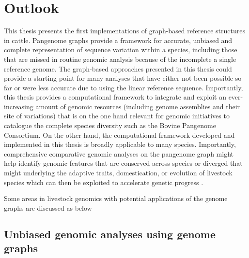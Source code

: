 \documentclass[../main.tex]{subfiles}
\begin{document}
\newpage

\section*{\LARGE{Outlook}}
{}
\thispagestyle{plain}

This thesis presents the first implementations of graph-based reference structures in cattle. Pangenome graphs provide a framework for accurate, unbiased and complete representation of sequence variation within a species, including those that are missed in routine genomic analysis because of the incomplete a single reference genome. The graph-based approaches presented in this thesis could provide a starting point for many analyses that have either not been possible so far or were less accurate due to using the linear reference sequence. Importantly, this thesis provides a computational framework to integrate and exploit an ever-increasing amount of genomic resources (including genome assemblies and their site of variations) that is on the one hand relevant for genomic initiatives to catalogue the complete species diversity such as the Bovine Pangenome Consortium. On the other hand, the computational framework developed and implemented in this thesis is broadly applicable to many species. Importantly, comprehensive comparative genomic analyses on the pangenome graph might help identify genomic features that are conserved across species or diverged that might underlying the adaptive traits, domestication, or evolution of livestock species which can then be exploited to accelerate genetic progress \citep{foissac2019multi,clark2020faang}. 

Some areas in livestock genomics with potential applications of the genome graphs are discussed as below

\subsection*{Unbiased genomic analyses using genome graphs}
\end{document}
